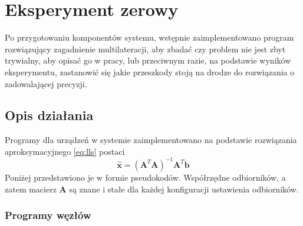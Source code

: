 \chapter{Eksperyment zerowy}\label{chap:experiment_zero}

Po przygotowaniu komponentów systemu, wstępnie zaimplementowano program rozwiązujący zagadnienie multilateracji, aby zbadać czy problem nie jest zbyt trywialny, aby opisać go w pracy, lub przeciwnym razie, na podstawie wyników eksperymentu, zastanowić się jakie przeszkody stoją na drodze do rozwiązania o zadowalającej precyzji.

\section{Opis działania}

Programy dla urządzeń w systemie zaimplementowano na podstawie rozwiązania aproksymacyjnego \ref{eq:lls} postaci
\begin{equation}
    \hat{\mathbf{x}} = {\left(\mathbf{A}^T\mathbf{A}\right)}^{-1}\mathbf{A}^T\mathbf{b}
\end{equation}
Poniżej przedstawiono je w formie pseudokodów. Współrzędne odbiorników, a zatem macierz $\mathbf{A}$ są znane i stałe dla każdej konfiguracji ustawienia odbiorników.

\subsection{Programy węzłów}

